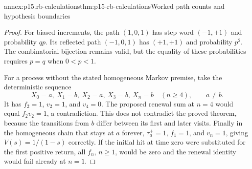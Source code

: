 \begin{annexitem}{annex:p15.rb-calculations}{thm:p15-rb-calculations}{Worked path counts and hypothesis boundaries}
\begin{proof}
For biased increments, the path \((1,0,1)\) has step word
\((-1,+1)\) and probability \(qp\).
Its reflected path \((-1,0,1)\) has \((+1,+1)\) and
probability \(p^2\). The combinatorial bijection remains
valid, but the equality of these probabilities requires \(p=q\)
when \(0<p<1\).

For a process without the stated homogeneous Markov premise,
take the deterministic sequence
\[
 X_0=a,\ X_1=b,\ X_2=a,\ X_3=b,\ X_n=b\quad(n\geq4),
 \qquad a\ne b.
 \]
It has \(f_2=1\), \(v_2=1\), and \(v_4=0\).
The proposed renewal sum at \(n=4\) would equal
\(f_2v_2=1\), a contradiction. This does not contradict the
proved theorem, because the transitions from \(b\) differ
between its first and later visits.
Finally in the homogeneous chain that stays at \(a\) forever,
\(\tau_a^+=1\), \(f_1=1\), and \(v_n=1\), giving
\(V(s)=1/(1-s)\) correctly.
If the initial hit at time zero were substituted for the first
positive return, all \(f_n\), \(n\geq1\), would be zero and
the renewal identity would fail already at \(n=1\).
\end{proof}
\end{annexitem}
